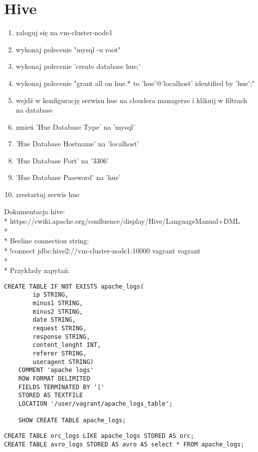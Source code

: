 \documentclass[11pt]{article}
\begin{document}
\section*{Hive}

\begin{enumerate}
\item zaloguj się na vm-cluster-node1
\item wykonaj polecenie "mysql -u root"
\item wykonaj polecenie 'create database hue;'
\item wykonaj polecenie "grant all on hue.* to 'hue'@'localhost' identified by 'hue';"
\item wejdź w konfigurację serwisu hue na cloudera managerze i kliknij w filtrach na database
\item zmień 'Hue Database Type' na 'mysql'
\item 'Hue Database Hostname' na 'localhost'
\item 'Hue Database Port' na '3306'
\item 'Hue Database Password' na 'hue'
\item zrestartuj serwis hue
\end{enumerate}

\pagebreak

Dokumentacja hive:
\\*
https://cwiki.apache.org/confluence/display/Hive/LanguageManual+DML
\\*
\\*
Beeline connection string:
\\*
!connect jdbc:hive2://vm-cluster-node1:10000 vagrant vagrant
\\*
\\*
Przykłady zapytań:
\begin{lstlisting}
CREATE TABLE IF NOT EXISTS apache_logs(
        ip STRING,
        minus1 STRING,
        minus2 STRING,
        date STRING,
        request STRING,
        response STRING,
        content_lenght INT,
        referer STRING,
        useragent STRING)
    COMMENT 'apache logs'
    ROW FORMAT DELIMITED
    FIELDS TERMINATED BY '|'
    STORED AS TEXTFILE
    LOCATION '/user/vagrant/apache_logs_table';
    
    SHOW CREATE TABLE apache_logs;	
\end{lstlisting}
\begin{lstlisting}
CREATE TABLE orc_logs LIKE apache_logs STORED AS orc;
CREATE TABLE avro_logs STORED AS avro AS select * FROM apache_logs;
\end{lstlisting}
\end{document}
